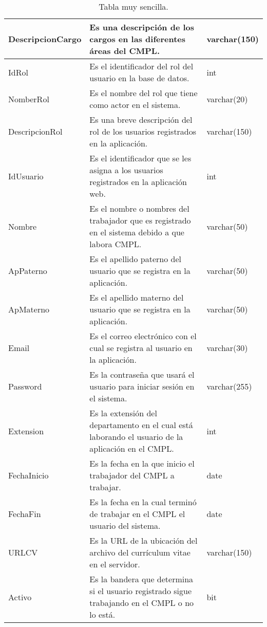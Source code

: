 \begin{table}[htbp!]
\begin{center}
\begin{tabular}{|l|l|l|}
			DescripcionCargo & Es una descripción de los cargos en las diferentes áreas del CMPL. & varchar(150)\\\hline
			IdRol & Es el identificador del rol del usuario en la base de datos. & int\\\hline
			NomberRol & Es el nombre del rol que tiene como actor en el sistema. & varchar(20)\\\hline
			DescripcionRol & Es una breve descripción del rol de los usuarios registrados en la aplicación. & varchar(150)\\\hline
			IdUsuario & Es el identificador que se les asigna a los usuarios registrados en la aplicación web. & int\\\hline
			Nombre & Es el nombre o nombres del trabajador que es registrado en el sistema debido a que labora CMPL. & varchar(50)\\\hline
			ApPaterno & Es el apellido paterno del usuario que se registra en la aplicación. & varchar(50)\\\hline
			ApMaterno & Es el apellido materno del usuario que se registra en la aplicación. & varchar(50)\\\hline
			Email & Es el correo electrónico con el cual se registra al usuario en la aplicación. & varchar(30)\\\hline
			Password & Es la contraseña que usará el usuario para iniciar sesión en el sistema. & varchar(255)\\\hline
			Extension & Es la extensión del departamento en el cual está laborando el usuario de la aplicación en el CMPL. & int\\\hline
			FechaInicio & Es la fecha en la que inicio el trabajador del CMPL a trabajar. & date\\\hline
			FechaFin & Es la fecha en la cual terminó de trabajar en el CMPL el usuario del sistema. & date \\\hline
			URLCV & Es la URL de la ubicación del archivo del currículum vitae en el servidor. & varchar(150)\\\hline
			Activo & Es la bandera que determina si el usuario registrado sigue trabajando en el CMPL o no lo está. & bit\\\hline
		\end{tabular}
		\caption{Tabla muy sencilla.}
		\label{tabla:sencilla}
	\end{center}
\end{table}

